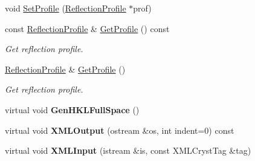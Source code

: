 \begin{DoxyCompactItemize}
\item 
void \mbox{\hyperlink{class_obj_cryst_1_1_powder_pattern_diffraction_abf4e4d356004068fc2ae2faaaf40c336}{Set\+Profile}} (\mbox{\hyperlink{class_obj_cryst_1_1_reflection_profile}{Reflection\+Profile}} $\ast$prof)
\item 
\mbox{\label{class_obj_cryst_1_1_powder_pattern_diffraction_a0696c1d61fddf939668437f717ef7de2}} 
const \mbox{\hyperlink{class_obj_cryst_1_1_reflection_profile}{Reflection\+Profile}} \& \mbox{\hyperlink{class_obj_cryst_1_1_powder_pattern_diffraction_a0696c1d61fddf939668437f717ef7de2}{Get\+Profile}} () const
\begin{DoxyCompactList}\small\item\em Get reflection profile. \end{DoxyCompactList}\item 
\mbox{\label{class_obj_cryst_1_1_powder_pattern_diffraction_a2fb703478384e3fe5a30d76a186dfcac}} 
\mbox{\hyperlink{class_obj_cryst_1_1_reflection_profile}{Reflection\+Profile}} \& \mbox{\hyperlink{class_obj_cryst_1_1_powder_pattern_diffraction_a2fb703478384e3fe5a30d76a186dfcac}{Get\+Profile}} ()
\begin{DoxyCompactList}\small\item\em Get reflection profile. \end{DoxyCompactList}\item 
\mbox{\label{class_obj_cryst_1_1_powder_pattern_diffraction_a71e9e48b207864e70b9773144e86069c}} 
virtual void {\bfseries Gen\+H\+K\+L\+Full\+Space} ()
\item 
\mbox{\label{class_obj_cryst_1_1_powder_pattern_diffraction_af265a05bd4ae410ffb99c6b64ddb42db}} 
virtual void {\bfseries X\+M\+L\+Output} (ostream \&os, int indent=0) const
\item 
\mbox{\label{class_obj_cryst_1_1_powder_pattern_diffraction_a2201905b644fb677057cad04da84160a}} 
virtual void {\bfseries X\+M\+L\+Input} (istream \&is, const X\+M\+L\+Cryst\+Tag \&tag)
\item 
\mbox{\label{class_obj_cryst_1_1_powder_pattern_diffraction_a7bf81f9b9087eee30d22acc78e37aa05}} 

\end{DoxyCompactItemize}
